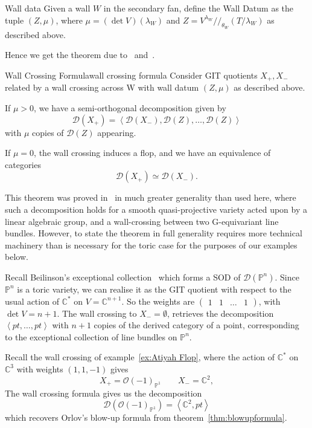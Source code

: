 \begin{definition}{Wall data}{}
	Given a wall $W$ in the secondary fan, define the Wall Datum as the tuple $(Z, \mu)$, where $\mu = (\det V)(\lambda_W)$ and $Z = V^{\lambda_{W}} / /_{\theta_{W}} \left( T/ \lambda_{W}\right)$ as described above. 
\end{definition}

Hence we get the theorem due to~\cite{halpernleistner2014derived} and~\cite{ballard2014variation}.

\begin{theorem}{Wall Crossing Formula}{wall crossing formula}
Consider GIT quotients $X_{+},X_{-}$  related by a wall crossing across W  with wall datum $(Z, \mu)$ as described above. 

If $\mu > 0$, we have a semi-orthogonal decomposition given by $$\mathcal{D}(X_{+}) = \left< \mathcal{D}(X_{-}),\mathcal{D}(Z) , \dots, \mathcal{D}(Z)  \right>$$ with $\mu$ copies of $\mathcal{D}(Z)$ appearing.

If $\mu = 0$, the wall crossing induces a flop, and we have an equivalence of categories $$\mathcal{D}(X_{+})\simeq \mathcal{D}(X_-).$$
\end{theorem}

This theorem was proved in~\cite{ballard2014variation} in much greater generality than used here, where such a decomposition holds for a smooth quasi-projective variety acted upon by a linear algebraic group, and a wall-crossing between two G-equivariant line bundles. However, to state the theorem in full generality requires more technical machinery than is necessary for the toric case for the purposes of our examples below. 

\begin{example}{}{}
    Recall Beilinson's exceptional collection~\cite{Beilinson1978} which forms a SOD of $\mathcal{D}(\mathbb{P}^n)$. Since $\mathbb{P}^n$ is a toric variety, we can realise it as the GIT quotient with respect to the usual action of $\mathbb{C}^*$ on $V = \mathbb{C}^{n+1}$. So the weights are $\begin{pmatrix}1 & 1 &\dots &1\end{pmatrix}$, with $\det V = n+1$. The wall crossing to $X_{-}=\emptyset$, retrieves the decomposition $\left< pt, \dots,pt \right>$ with $n+1$ copies of the derived category of a point, corresponding to the exceptional collection of line bundles on $\mathbb{P}^n$. 
\end{example}

\begin{example}{}{}
	Recall the wall crossing of example~\ref*{ex:Atiyah Flop}, where the action of $\mathbb{C}^{*}$ on $\mathbb{C}^3$ with weights $(1,1,-1)$ gives $$X_{+}= \mathcal{O}(-1)_{\mathbb{P}^{1}} \qquad X_{-}= \mathbb{C}^2, $$ The wall crossing formula gives us the decomposition $$\mathcal{D}(\mathcal{O}(-1)_{\mathbb{P}^{1}})= \left< \mathbb{C}^{2}, pt \right> $$ which recovers Orlov's blow-up formula from theorem~\ref*{thm:blowupformula}.
\end{example}

